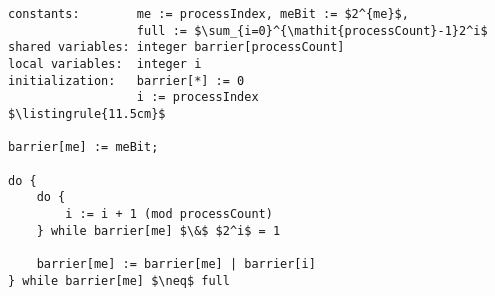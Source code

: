 \begin{center}
\begin{minipage}{\textwidth}
\begin{lstlisting}[mathescape, linewidth=11.5cm]
constants:        me := processIndex, meBit := $2^{me}$,
                  full := $\sum_{i=0}^{\mathit{processCount}-1}2^i$
shared variables: integer barrier[processCount]
local variables:  integer i
initialization:   barrier[*] := 0
                  i := processIndex
$\listingrule{11.5cm}$

barrier[me] := meBit;

do {
	do {
		i := i + 1 (mod processCount)
	} while barrier[me] $\&$ $2^i$ = 1

	barrier[me] := barrier[me] | barrier[i]
} while barrier[me] $\neq$ full
\end{lstlisting}
\end{minipage}
\end{center}
